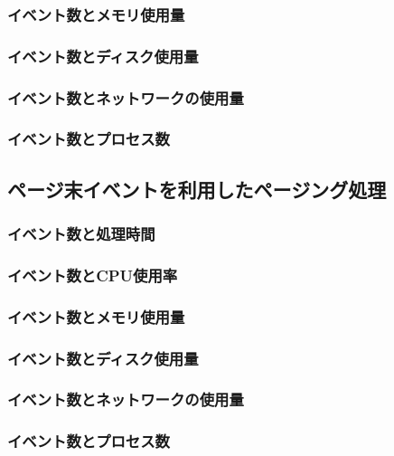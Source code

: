 \documentclass[../../main]{subfiles}
\begin{document}
    \subsubsection{イベント数とメモリ使用量}\label{subsubsec:result-paging-offset-memory}
    \subsubsection{イベント数とディスク使用量}\label{subsubsec:result-paging-offset-disk}
    \subsubsection{イベント数とネットワークの使用量}\label{subsubsec:result-paging-offset-network}
    \subsubsection{イベント数とプロセス数}\label{subsubsec:result-paging-offset-process}

    \subsection{ページ末イベントを利用したページング処理}\label{subsec:result-paging-last}
    \subsubsection{イベント数と処理時間}\label{subsubsec:result-paging-last-time}
    \subsubsection{イベント数とCPU使用率}\label{subsubsec:result-paging-last-cpu}
    \subsubsection{イベント数とメモリ使用量}\label{subsubsec:result-paging-last-memory}
    \subsubsection{イベント数とディスク使用量}\label{subsubsec:result-paging-last-disk}
    \subsubsection{イベント数とネットワークの使用量}\label{subsubsec:result-paging-last-network}
    \subsubsection{イベント数とプロセス数}\label{subsubsec:result-paging-last-process}
\end{document}
